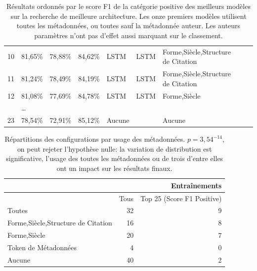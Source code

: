 \begin{table}[ht]
{\begin{tabular}{@{}lllllllll@{}}
10   & 81,65\%            & 78,88\%          & 84,62\%             & LSTM            & LSTM              & Forme,Siècle,Structure de Citation \\
11   & 81,24\%            & 78,49\%          & 84,19\%             & LSTM            & LSTM              & Forme,Siècle,Structure de Citation \\
12   & 81,08\%            & 77,69\%          & 84,78\%             & LSTM            & LSTM              & Forme,Siècle                       \\
     & …                  &                  &                     &                 &                   &                                    \\
23   & 78,54\%            & 72,91\%          & 85,12\%             & Aucune          &                   & Aucune                             \\ \bottomrule
\end{tabular}%
}
\caption{Résultats ordonnés par le score F1 de la catégorie positive des meilleurs modèles sur la recherche de meilleure architecture. Les onze premiers modèles utilisent toutes les métadonnées, ou toutes sauf la métadonnée auteur. Les auteurs paramètres n'ont pas d'effet aussi marquant sur le classement.}
\label{tab:chap4:resultats-metadata}
\end{table}

\begin{table}[ht]
\centering
\begin{tabular}{l|r|r}
                                   & \multicolumn{2}{r}{Entraînements} \\ \hline
                                   & Tous & Top 25 (Score F1 Positive) \\ \hline
Toutes                             & 32   & 9                          \\
Forme,Siècle,Structure de Citation & 16   & 8                          \\
Forme,Siècle                       & 20   & 7                          \\
Token de Métadonnées               & 4    & 0                          \\
Aucune                             & 40   & 2                          \\ \hline
\end{tabular}
\caption{Répartitions des configurations par usage des métadonnées. $p=3,54^{-14}$, on peut rejeter l'hypothèse nulle: la variation de distribution est significative, l'usage des toutes les métadonnées ou de trois d'entre elles ont un impact sur les résultats finaux.}
\label{tab:chap4:metadata-p-value}
\end{table}

